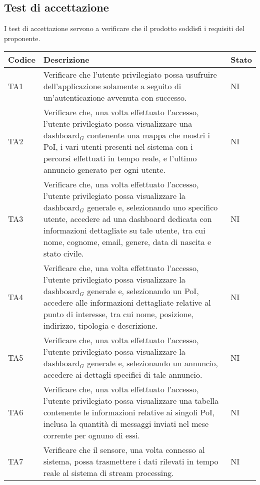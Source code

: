\documentclass[10pt]{article}
\begin{document}
\begin{justify}
\subsection{Test di accettazione}
I test di accettazione servono a verificare che il prodotto soddisfi i requisiti del proponente.\\

\begin{longtable}{|>{\centering\arraybackslash}m{2cm}|>{\centering\arraybackslash}m{7cm}|>{\centering\arraybackslash}m{2cm}|}
\hline
\textbf{Codice} & \textbf{Descrizione} & \textbf{Stato}\\
\endhead
\hline
TA1 & Verificare che l'utente privilegiato possa usufruire dell'applicazione solamente a seguito di un'autenticazione avvenuta con successo. & NI \\
\hline
TA2 & Verificare che, una volta effettuato l'accesso, l'utente privilegiato possa visualizzare una dashboard$_G$ contenente una mappa che mostri i PoI, i vari utenti presenti nel sistema con i percorsi effettuati in tempo reale, e l'ultimo annuncio generato per ogni utente. & NI \\
\hline
TA3 & Verificare che, una volta effettuato l'accesso, l'utente privilegiato possa visualizzare la dashboard$_G$ generale e, selezionando uno specifico utente, accedere ad una dashboard dedicata con informazioni dettagliate su tale utente, tra cui nome, cognome, email, genere, data di nascita e stato civile. & NI \\
\hline
TA4 & Verificare che, una volta effettuato l'accesso, l'utente privilegiato possa visualizzare la dashboard$_G$ generale e, selezionando un PoI, accedere alle informazioni dettagliate relative al punto di interesse, tra cui nome, posizione, indirizzo, tipologia e descrizione. & NI \\
\hline
TA5 & Verificare che, una volta effettuato l'accesso, l'utente privilegiato possa visualizzare la dashboard$_G$ generale e, selezionando un annuncio, accedere ai dettagli specifici di tale annuncio. & NI \\
\hline
TA6 & Verificare che, una volta effettuato l'accesso, l'utente privilegiato possa visualizzare una tabella contenente le informazioni relative ai singoli PoI, inclusa la quantità di messaggi inviati nel mese corrente per ognuno di essi. & NI \\
\hline
TA7 & Verificare che il sensore, una volta connesso al sistema, possa trasmettere i dati rilevati in tempo reale al sistema di stream processing. & NI \\

\end{longtable}
\end{justify}
\end{document}
